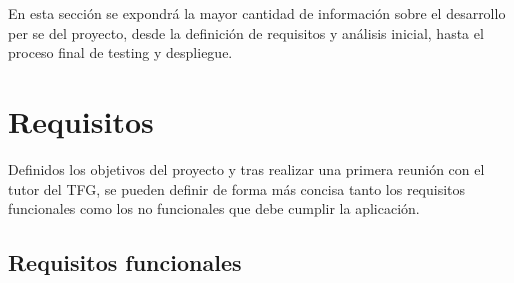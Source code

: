 En esta sección se expondrá la mayor cantidad de información sobre el desarrollo per se
del proyecto, desde la definición de requisitos y análisis inicial, hasta el proceso final
de testing y despliegue.

\section{Requisitos}

Definidos los objetivos del proyecto y tras realizar una primera reunión
con el tutor del TFG, se pueden definir de forma más concisa tanto los
requisitos funcionales como los no funcionales que debe cumplir la aplicación.

\subsection{Requisitos funcionales}

